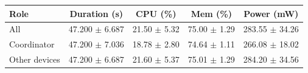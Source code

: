 \begin{tabular}{lcccc}
\hline
\textbf{Role} & \textbf{Duration (s)} & \textbf{CPU (\%)} & \textbf{Mem (\%)} & \textbf{Power (mW)} \\
\hline
All & 47.200 $\pm$ 6.687 & 21.50 $\pm$ 5.32 & 75.00 $\pm$ 1.29 & 283.55 $\pm$ 34.26 \\
Coordinator & 47.200 $\pm$ 7.036 & 18.78 $\pm$ 2.80 & 74.64 $\pm$ 1.11 & 266.08 $\pm$ 18.02 \\
Other devices & 47.200 $\pm$ 6.687 & 21.60 $\pm$ 5.37 & 75.01 $\pm$ 1.29 & 284.20 $\pm$ 34.56 \\
\hline
\end{tabular}
